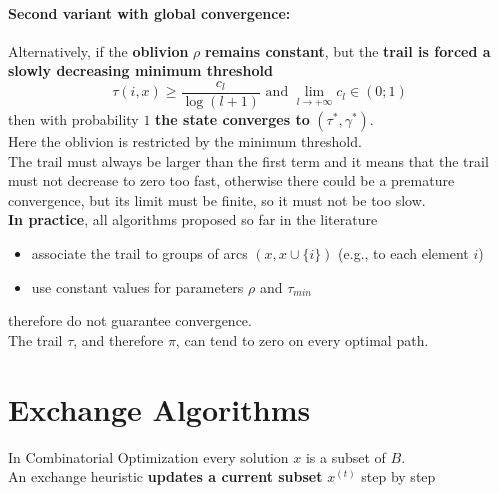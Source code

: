 \documentclass[11pt]{article}
\begin{document}
	\newpage
	
	\paragraph{Second variant with global convergence:} Alternatively, if the \textbf{oblivion} $\rho$ \textbf{remains constant}, but the \textbf{trail is forced a slowly decreasing minimum threshold}
	$$ \tau (i,x) \geq \frac{c_l}{\log(l+1)} \text{ and } \lim_{l \rightarrow + \infty} c_l \in (0;1)$$
	then with probability $1$ \textbf{the state converges to} $(\tau^\ast, \gamma^\ast)$.\\
	
	Here the oblivion is restricted by the minimum threshold.\\
	
	The trail must always be larger than the first term and it means that the trail must not decrease to zero too fast, otherwise there could be a premature convergence, but its limit must be finite, so it must not be too slow.\\ 
	
	
	\textbf{In practice}, all algorithms proposed so far in the literature
	\begin{itemize}
		\item associate the trail to groups of arcs $(x, x \cup \{i\})$ (e.g., to each element $i$)
		
		\item use constant values for parameters $\rho$ and $\tau_{min}$
	\end{itemize}
	therefore do not guarantee convergence.\\
	
	The trail $\tau$, and therefore $\pi$, can tend to zero on every optimal path.\\
	
	
	\newpage
	
	\section{Exchange Algorithms}
	
	In Combinatorial Optimization every solution $x$ is a subset of $B$.\\
	
	An exchange heuristic \textbf{updates a current subset} $x^{(t)}$ step by step
	
\end{document}
